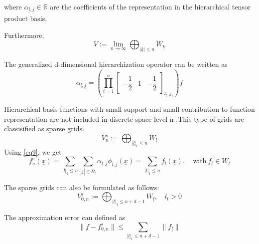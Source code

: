 where $\alpha_{\underline{l},\underline{j}} \in \mathbb{R} $ are the coefficients of the representation in the hierarchical tensor product basis. 

Furthermore,
\begin{equation}
    V := \lim\limits_{n\rightarrow\infty} \bigoplus_{|\underline{k}|\le n} W_{\underline{k}}
\end{equation}

The generalized d-dimensional hierarchization operator can be written as
\begin{equation}
    \alpha_{\underline{l},\underline{j}} = \left( \prod_{t=1}^{n}
    \left[
    \begin{array}{ccc}
	    -\dfrac{1}{2} & 1 & -\dfrac{1}{2}
    \end{array}
    \right]_{l_t,j_t}
     \right) f
\end{equation}

Hierarchical basis functions with small support and small contribution to function representation are not included in discrete space level n .This type of grids are classisified as sparse grids. 
\begin{equation}
    V_{n}^s := \bigoplus_{|\underline{l}|_1\le n} W_{\underline{l}}
\end{equation}
Using \eqref{eq9}, we get 
\begin{equation}
    f_{n}^s \left(\underline{x}\right) 
    = \sum_{|\underline{l}|_1\le n} \sum_{|\underline{j}|\in B_{\underline{l}}} \alpha_{\underline{l},\underline{j}}\phi_{\underline{l},\underline{j}}\left(\underline{x}\right) 
    = \sum_{|\underline{l}|_1\le n} f_{\underline{l}}(\underline{x}), \quad \text{with} \ f_{\underline{l}} \in W_{\underline{l}}
\end{equation}

The sparse grids can also be formulated as follows:
\begin{equation}
    V_{0,n}^s := \bigoplus_{|\underline{l}|_1\le n+d-1} W_{\underline{l}}, \quad l_t > 0
\end{equation}

The approximation error can defined as
\begin{equation}
	\parallel f - f_{0,n}^s \parallel \le \sum_{|\underline{l}|_1\le n+d-1} \parallel f_{\underline{l}}\parallel
\end{equation}

